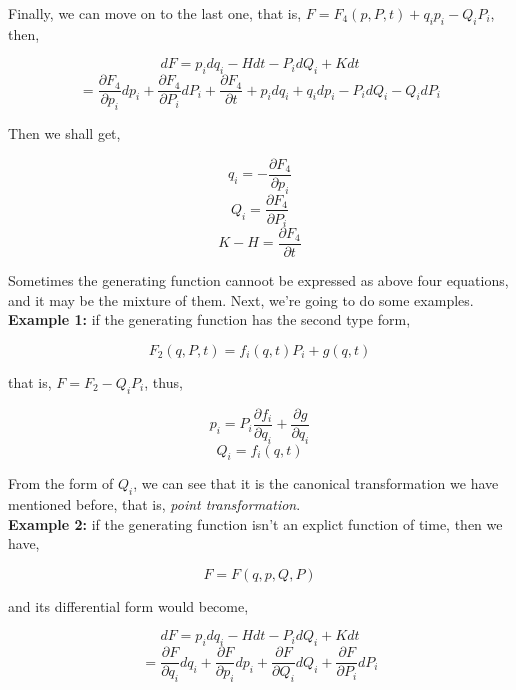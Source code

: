 \documentclass[12pt]{article}
\numberwithin{equation}{section}
\begin{document}
Finally, we can move on to the last one, that is, $F = F_4(p, P, t) + q_ip_i - Q_iP_i $, then,

\begin{center}
    \[ dF = p_idq_i - Hdt - P_idQ_i + Kdt \]
    \[ = \frac{\partial F_4}{\partial p_i}dp_i + \frac{\partial F_4}{\partial P_i}dP_i + \frac{\partial F_4}{\partial t} + p_idq_i + q_idp_i - P_idQ_i - Q_idP_i \]
\end{center}

Then we shall get,

\begin{center}
    \[ q_i = - \frac{\partial F_4}{\partial p_i} \]
    \[ Q_i = \frac{\partial F_4}{\partial P_i} \]
    \[ K - H = \frac{\partial F_4}{\partial t} \]
\end{center}

Sometimes the generating function cannoot be expressed as above four equations, and it may be the mixture of them. Next, we're going to do some examples.
\\
\indent \textbf{Example 1: }if the generating function has the second type form,

\begin{center}
    \[ F_2(q, P, t) = f_i(q, t)P_i + g(q, t) \]
\end{center}

that is, $F = F_2 - Q_iP_i $, thus, 

\begin{center}
    \[ p_i = P_i \frac{\partial f_i}{\partial q_i} + \frac{\partial g}{\partial q_i} \]
    \[ Q_i = f_i(q, t) \]
\end{center}

From the form of $Q_i$, we can see that it is the canonical transformation we have mentioned before, that is, \textit{point transformation}.
\\
\indent \textbf{Example 2: }if the generating function isn't an explict function of time, then we have,

\begin{center}
    \[ F = F(q, p, Q, P) \]
\end{center}

and its differential form would become,

\begin{center}
    \[ dF = p_idq_i - Hdt - P_idQ_i + Kdt \]
    \[ = \frac{\partial F}{\partial q_i}dq_i + \frac{\partial F}{\partial p_i}dp_i + \frac{\partial F}{\partial Q_i}dQ_i + \frac{\partial F}{\partial P_i}dP_i \]
\end{center}
\end{document}
